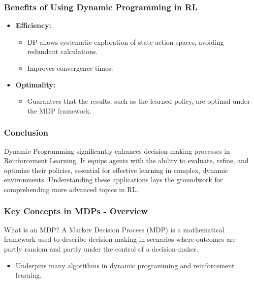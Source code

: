 \documentclass[aspectratio=169]{beamer}
\begin{document}
\begin{frame}[fragile]
    \frametitle{Benefits of Using Dynamic Programming in RL}
    \begin{itemize}
        \item \textbf{Efficiency:} 
            \begin{itemize}
                \item DP allows systematic exploration of state-action spaces, avoiding redundant calculations.
                \item Improves convergence times.
            \end{itemize}
        \item \textbf{Optimality:} 
            \begin{itemize}
                \item Guarantees that the results, such as the learned policy, are optimal under the MDP framework.
            \end{itemize}
    \end{itemize}
\end{frame}

\begin{frame}[fragile]
    \frametitle{Conclusion}
    Dynamic Programming significantly enhances decision-making processes in Reinforcement Learning. It equips agents with the ability to evaluate, refine, and optimize their policies, essential for effective learning in complex, dynamic environments. Understanding these applications lays the groundwork for comprehending more advanced topics in RL.
\end{frame}

\begin{frame}[fragile]
    \frametitle{Key Concepts in MDPs - Overview}
    \begin{block}{What is an MDP?}
        A Markov Decision Process (MDP) is a mathematical framework used to describe decision-making in scenarios where outcomes are partly random and partly under the control of a decision-maker.
    \end{block}
    \begin{itemize}
        \item Underpins many algorithms in dynamic programming and reinforcement learning.
    \end{itemize}
\end{frame}
\end{document}
